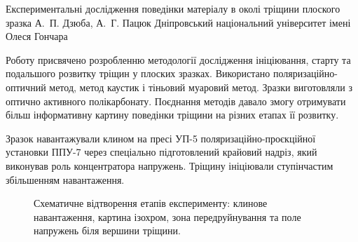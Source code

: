 \ReportHeading
  {Експериментальні дослідження поведінки матеріалу в околі тріщини плоского зразка}
  {А.~П. Дзюба, А.~Г. Пацюк}
  {Дніпровський національний університет імені Олеся Гончара}
  {}

Роботу присвячено розробленню методології дослідження ініціювання, старту та подальшого розвитку тріщин у плоских зразках. Використано поляризаційно-оптичний метод, метод каустик і тіньовий муаровий метод. Зразки виготовляли з оптично активного полікарбонату. Поєднання методів давало змогу отримувати більш інформативну картину поведінки тріщини на різних етапах її розвитку.

Зразок навантажували клином на пресі УП-5 поляризаційно-проєкційної установки ППУ-7 через спеціально підготовлений крайовий надріз, який виконував роль концентратора напружень. Тріщину ініціювали ступінчастим збільшенням навантаження.

\begin{figure}[htbp]
\centering
{}
\caption{Схематичне відтворення етапів експерименту: клинове навантаження, картина ізохром, зона передруйнування та поле напружень біля вершини тріщини.}
\end{figure}

